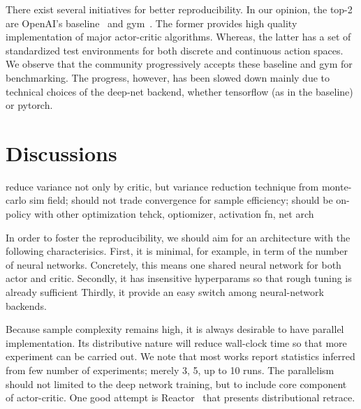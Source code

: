 There exist several initiatives for better reproducibility.
In our opinion, the top-2 are OpenAI's baseline~\cite{} and gym~\cite{}.
The former provides high quality implementation of major actor-critic algorithms.
Whereas, the latter has a set of standardized test environments for both discrete and continuous action spaces.
We observe that the community progressively accepts these baseline and gym for benchmarking.
The progress, however, has been slowed down mainly due to technical choices of the deep-net backend,
whether tensorflow (as in the baseline) or pytorch.

\section{Discussions}
reduce variance not only by critic, but variance reduction technique from monte-carlo sim field;
should not trade convergence for sample efficiency;
should be on-policy with other optimization tehck, optiomizer, activation fn, net arch

In order to foster the reproducibility, we should aim for an architecture with the following characterisics.
First, it is minimal, for example, in term of the number of neural networks.
Concretely, this means one shared neural network for both actor and critic.
Secondly, it has insensitive hyperparams so that rough tuning is already sufficient
Thirdly, it provide an easy switch among neural-network backends.

Because sample complexity remains high, it is always desirable to have parallel implementation.
Its distributive nature will reduce wall-clock time so that more experiment can be carried out.
We note that most works report statistics inferred from few number of experiments; merely 3, 5, up to 10 runs.
The parallelism should not limited to the deep network training, but to include core component of actor-critic.
One good attempt is Reactor~\cite{} that presents distributional retrace.
